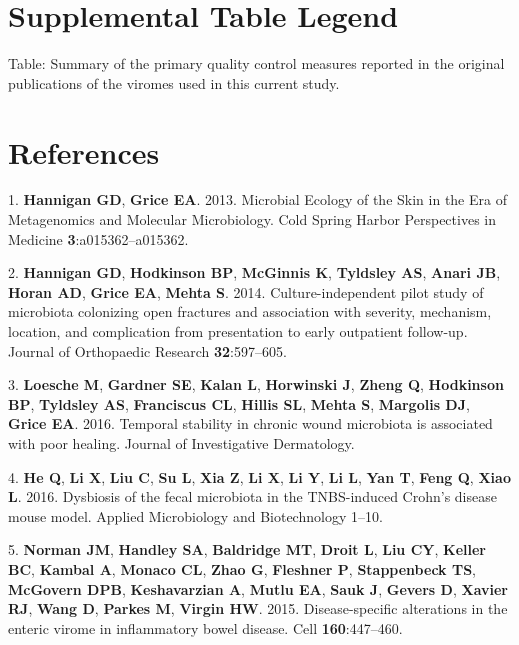 \documentclass[12pt,]{article}
\begin{document}
\newpage

\section{Supplemental Table Legend}\label{supplemental-table-legend}

Table: Summary of the primary quality control measures reported in the
original publications of the viromes used in this current study.

\newpage

\section*{References}\label{references}

\hypertarget{refs}{}
\hypertarget{ref-Hannigan:2013im}{}
1. \textbf{Hannigan GD}, \textbf{Grice EA}. 2013. Microbial Ecology of
the Skin in the Era of Metagenomics and Molecular Microbiology. Cold
Spring Harbor Perspectives in Medicine \textbf{3}:a015362--a015362.

\hypertarget{ref-Hannigan:2014be}{}
2. \textbf{Hannigan GD}, \textbf{Hodkinson BP}, \textbf{McGinnis K},
\textbf{Tyldsley AS}, \textbf{Anari JB}, \textbf{Horan AD},
\textbf{Grice EA}, \textbf{Mehta S}. 2014. Culture-independent pilot
study of microbiota colonizing open fractures and association with
severity, mechanism, location, and complication from presentation to
early outpatient follow-up. Journal of Orthopaedic Research
\textbf{32}:597--605.

\hypertarget{ref-Loesche:2016ev}{}
3. \textbf{Loesche M}, \textbf{Gardner SE}, \textbf{Kalan L},
\textbf{Horwinski J}, \textbf{Zheng Q}, \textbf{Hodkinson BP},
\textbf{Tyldsley AS}, \textbf{Franciscus CL}, \textbf{Hillis SL},
\textbf{Mehta S}, \textbf{Margolis DJ}, \textbf{Grice EA}. 2016.
Temporal stability in chronic wound microbiota is associated with poor
healing. Journal of Investigative Dermatology.

\hypertarget{ref-He:2016ch}{}
4. \textbf{He Q}, \textbf{Li X}, \textbf{Liu C}, \textbf{Su L},
\textbf{Xia Z}, \textbf{Li X}, \textbf{Li Y}, \textbf{Li L}, \textbf{Yan
T}, \textbf{Feng Q}, \textbf{Xiao L}. 2016. Dysbiosis of the fecal
microbiota in the TNBS-induced Crohn's disease mouse model. Applied
Microbiology and Biotechnology 1--10.

\hypertarget{ref-Norman:2015kb}{}
5. \textbf{Norman JM}, \textbf{Handley SA}, \textbf{Baldridge MT},
\textbf{Droit L}, \textbf{Liu CY}, \textbf{Keller BC}, \textbf{Kambal
A}, \textbf{Monaco CL}, \textbf{Zhao G}, \textbf{Fleshner P},
\textbf{Stappenbeck TS}, \textbf{McGovern DPB}, \textbf{Keshavarzian A},
\textbf{Mutlu EA}, \textbf{Sauk J}, \textbf{Gevers D}, \textbf{Xavier
RJ}, \textbf{Wang D}, \textbf{Parkes M}, \textbf{Virgin HW}. 2015.
Disease-specific alterations in the enteric virome in inflammatory bowel
disease. Cell \textbf{160}:447--460.
\end{document}
